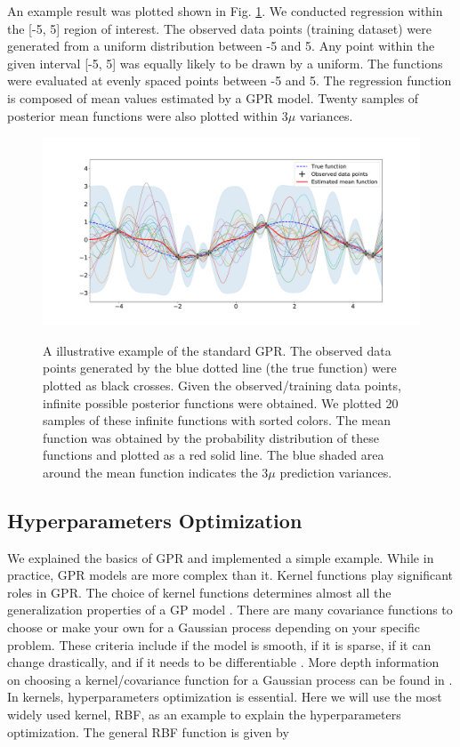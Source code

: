\documentclass[preprint,12pt]{elsarticle}
\begin{document}
An example result was plotted shown in Fig. \ref{FIG:10}. We conducted regression within the [-5, 5] region of interest. The observed data points (training dataset) were generated from a uniform distribution between -5 and 5. Any point within the given interval [-5, 5] was equally likely to be drawn by a uniform. The functions were evaluated at evenly spaced points between -5 and 5. The regression function is composed of mean values estimated by a GPR model. Twenty samples of posterior mean functions were also plotted within $3\mu$ variances. 

\begin{figure}[h!]
	\centering
		{{\includegraphics[trim=4.5cm 1.5cm 4.4cm 1.0cm, width=\textwidth]{figs/illustrative_posterior_func.pdf}}}
	\caption{A illustrative example of the standard GPR. The observed data points generated by the blue dotted line (the true function) were plotted as black crosses.  Given the observed/training data points, infinite possible posterior functions were obtained. We plotted 20 samples of these infinite functions with sorted colors. The mean function was obtained by the probability distribution of these functions and plotted as a red solid line. The blue shaded area around the mean function indicates the $3\mu$ prediction variances.}
	\label{FIG:10}
\end{figure}

\subsection{Hyperparameters Optimization}\label{Hyperparameters}

We explained the basics of GPR and implemented a simple example. While in practice, GPR models are more complex than it. Kernel functions play significant roles in GPR. The choice of kernel functions determines almost all the generalization properties of a GP model \cite{duvenaud2016kernel}. There are many covariance functions to choose or make your own for a Gaussian process depending on your specific problem. These criteria include if the model is smooth, if it is sparse, if it can change drastically, and if it needs to be differentiable \cite{duvenaud2014automatic}. More depth information on choosing a kernel/covariance function for a Gaussian process can be found in \cite{duvenaud2014automatic}. In kernels, hyperparameters optimization is essential. Here we will use the most widely used kernel, RBF, as an example to explain the hyperparameters optimization. The general RBF function is given by
\end{document}
